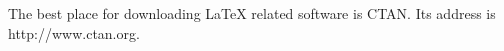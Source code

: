 \documentclass{article}
\begin{document}
The best place for downloading LaTeX related software is CTAN.
Its address is \ttfamily http://www.ctan.org\rmfamily.

\end{document}

